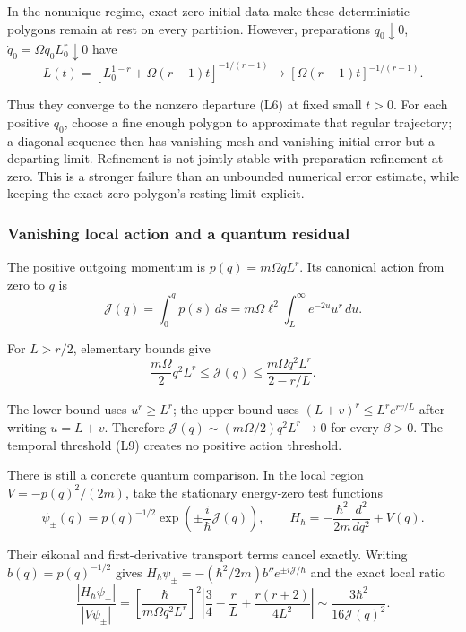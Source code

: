 \documentclass[11pt,a4paper]{article}
\begin{document}
In the nonunique regime, exact zero initial data make these
deterministic polygons remain at rest on every partition. However,
preparations \(q_0\downarrow0\), \(\dot q_0=\Omega q_0L_0^r\downarrow0\)
have \[
 L(t)=\left[L_0^{1-r}+\Omega(r-1)t\right]^{-1/(r-1)}
       \longrightarrow [\Omega(r-1)t]^{-1/(r-1)}.
 \tag{L10}
\]

Thus they converge to the nonzero departure (L6) at fixed small \(t>0\).
For each positive \(q_0\), choose a fine enough polygon to approximate
that regular trajectory; a diagonal sequence then has vanishing mesh and
vanishing initial error but a departing limit. Refinement is not jointly
stable with preparation refinement at zero. This is a stronger failure
than an unbounded numerical error estimate, while keeping the exact-zero
polygon's resting limit explicit.

\subsubsection{Vanishing local action and a quantum
residual}\label{vanishing-local-action-and-a-quantum-residual}

The positive outgoing momentum is \(p(q)=m\Omega qL^r\). Its canonical
action from zero to \(q\) is \[
 \mathcal J(q)=\int_0^q p(s)\,ds
       =m\Omega\ell^2\int_L^\infty e^{-2u}u^r\,du.
 \tag{L11}
\]

For \(L>r/2\), elementary bounds give \[
 \frac{m\Omega}2q^2L^r
 \le\mathcal J(q)
 \le\frac{m\Omega q^2L^r}{2-r/L}.
 \tag{L12}
\]

The lower bound uses \(u^r\ge L^r\); the upper bound uses
\((L+v)^r\le L^r e^{rv/L}\) after writing \(u=L+v\). Therefore
\(\mathcal J(q)\sim(m\Omega/2)q^2L^r\to0\) for every \(\beta>0\). The
temporal threshold (L9) creates no positive action threshold.

There is still a concrete quantum comparison. In the local region
\(V=-p(q)^2/(2m)\), take the stationary energy-zero test functions \[
 \psi_\pm(q)=p(q)^{-1/2}
          \exp\left(\pm\frac{i}{\hbar}\mathcal J(q)\right),
 \qquad H_\hbar=-\frac{\hbar^2}{2m}\frac{d^2}{dq^2}+V(q).
 \tag{L13}
\]

Their eikonal and first-derivative transport terms cancel exactly.
Writing \(b(q)=p(q)^{-1/2}\) gives \(H_\hbar\psi_\pm
=-(\hbar^2/2m)b''e^{\pm i\mathcal J/\hbar}\) and the exact local ratio
\[
 \frac{|H_\hbar\psi_\pm|}{|V\psi_\pm|}
 =\left[\frac{\hbar}{m\Omega q^2L^r}\right]^2
       \left|\frac34-\frac rL+\frac{r(r+2)}{4L^2}\right|
 \sim\frac{3\hbar^2}{16\mathcal J(q)^2}.
 \tag{L14}
\]
\end{document}
